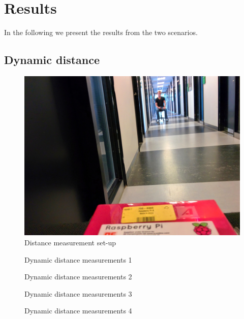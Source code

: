 \chapter{Results}
\label{sec_results}

In the following we present the results from the two scenarios.

\section{Dynamic distance}

\begin{figure}
	\centering
	\includegraphics[width=0.5\paperwidth]{img/hopper_maaling1.jpg}
	\caption{ Distance measurement set-up }
	\label{fig_distance_mesurement}
\end{figure}

\begin{figure}		
	\centering
	
	
	\caption{ Dynamic distance measurements 1 }
	\label{graf_hopper1}
	
%
	\vspace{1.5cm}

	
	
	\caption{ Dynamic distance measurements 2 }
	\label{graf_hopper2}
	
\end{figure}

\begin{figure}		
	\centering
	
	
	\caption{ Dynamic distance measurements 3 }
	\label{graf_hopper3}
	
%
	\vspace{1.5cm}
	
	
	\caption{ Dynamic distance measurements 4 }
	\label{graf_hopper4}
	
\end{figure}

